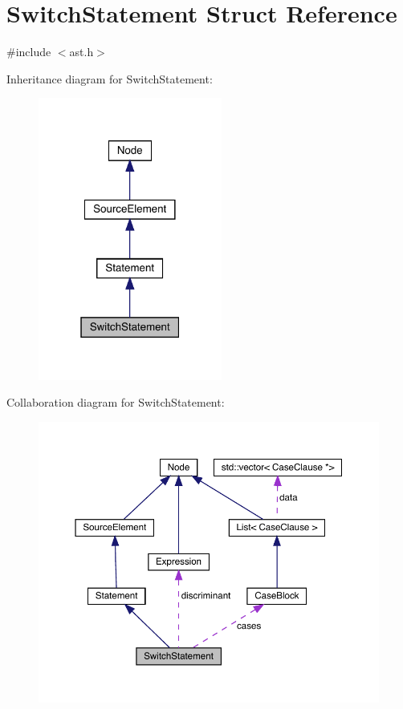 \hypertarget{struct_switch_statement}{}\section{Switch\+Statement Struct Reference}
\label{struct_switch_statement}


{\ttfamily \#include $<$ast.\+h$>$}



Inheritance diagram for Switch\+Statement\+:
\nopagebreak
\begin{figure}[H]
\begin{center}
\leavevmode
\includegraphics[width=171pt]{struct_switch_statement__inherit__graph}
\end{center}
\end{figure}


Collaboration diagram for Switch\+Statement\+:
\nopagebreak
\begin{figure}[H]
\begin{center}
\leavevmode
\includegraphics[width=350pt]{struct_switch_statement__coll__graph}
\end{center}
\end{figure}
